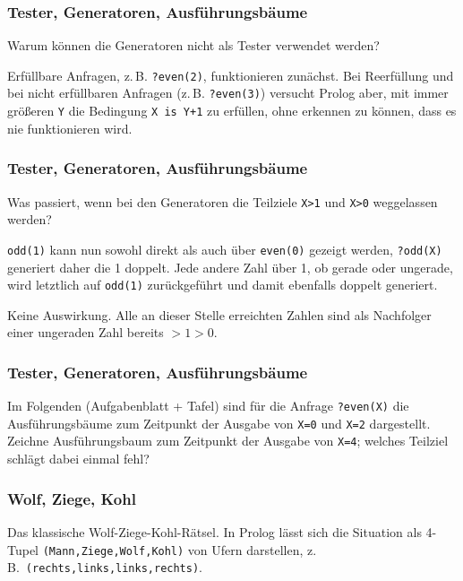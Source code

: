 \documentclass{beamer}
\begin{document}
\begin{frame}
  \frametitle{Tester, Generatoren, Ausführungsbäume}
  
  Warum können die Generatoren nicht als Tester verwendet werden?
  
  \pause
  Erfüllbare Anfragen, z.\,B. \lstinline{?even(2)}, funktionieren zunächst.
  Bei Reerfüllung und bei nicht erfüllbaren Anfragen (z.\,B. \lstinline{?even(3)}) versucht Prolog aber,
  mit immer größeren \lstinline{Y} die Bedingung \lstinline{X is Y+1} zu erfüllen,
  ohne erkennen zu können, dass es nie funktionieren wird.
\end{frame}

\begin{frame}
  \frametitle{Tester, Generatoren, Ausführungsbäume}
  
  Was passiert, wenn bei den Generatoren die Teilziele \lstinline{X>1} und \lstinline{X>0} weggelassen werden?
  
  \begin{description}
  \pause
  \item[\texttt{X>1}]
    \lstinline{odd(1)} kann nun sowohl direkt als auch über \lstinline{even(0)} gezeigt werden,
    \lstinline{?odd(X)} generiert daher die 1 doppelt.
    Jede andere Zahl über 1, ob gerade oder ungerade, wird letztlich auf \lstinline{odd(1)} zurückgeführt und damit ebenfalls doppelt generiert.
  \pause
  \item[\texttt{X>0}]
    Keine Auswirkung.
    Alle an dieser Stelle erreichten Zahlen sind als Nachfolger einer ungeraden Zahl bereits $>1>0$.
  \end{description}
\end{frame}

\begin{frame}
  \frametitle{Tester, Generatoren, Ausführungsbäume}
  
  Im Folgenden (Aufgabenblatt + Tafel) sind für die Anfrage \lstinline{?even(X)} die Ausführungsbäume zum Zeitpunkt der Ausgabe von \lstinline{X=0} und \lstinline{X=2} dargestellt.
  Zeichne Ausführungsbaum zum Zeitpunkt der Ausgabe von \lstinline{X=4}; welches Teilziel schlägt dabei einmal fehl?
\end{frame}

\begin{frame}
  \frametitle{Wolf, Ziege, Kohl}
  Das klassische Wolf-Ziege-Kohl-Rätsel.
  In Prolog lässt sich die Situation als 4-Tupel \lstinline{(Mann,Ziege,Wolf,Kohl)} von Ufern darstellen,
  z.\,B.~\lstinline{(rechts,links,links,rechts)}.
\end{frame}
\end{document}
